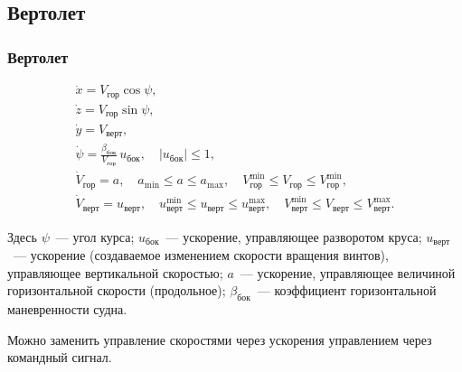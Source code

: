 \documentclass[10pt,t]{beamer}
\begin{document}
\subsection[Вертолет]{Вертолет}
\begin{frame}
\frametitle{Вертолет}
\small

\begin{equation*}
  \begin{array}{l}
    \dot x = V_\text{гор} \cos \psi, \\[0.75ex]
    \dot z = V_\text{гор} \sin \psi, \\[0.75ex]
    \dot y = V_\text{верт}, \\[0.75ex]
    \dot \psi   = \frac{\beta_\text{бок}}{V_\text{гор}} \, u_\text{бок}, \quad |u_\text{бок}| \leqslant 1, \\[0.75ex]
    \dot V_\text{гор} = a, \quad  
      a_{\min} \leqslant a \leqslant a_{\max},
      \quad V^{\min}_\text{гор} \leqslant V_\text{гор} \leqslant V^{\min}_\text{гор}, \\[0.75ex]
    \dot V_\text{верт} = u_\text{верт},
      \quad u^{\min}_\text{верт} \leqslant u_\text{верт} \leqslant u^{\max}_\text{верт}, \quad
      V^{\min}_\text{верт} \leqslant V_\text{верт} \leqslant V^{\max}_\text{верт}.
  \end{array}
\end{equation*}

Здесь $\psi$~--- угол курса; $u_\text{бок}$~--- ускорение, управляющее разворотом круса; $u_\text{верт}$~--- ускорение (создаваемое изменением скорости вращения винтов), управляющее вертикальной скоростью; $a$~--- ускорение, управляющее величиной горизонтальной скорости (продольное); $\beta_\text{бок}$~--- коэффициент горизонтальной маневренности судна.

Можно заменить управление скоростями через ускорения управлением через командный сигнал. 

\end{frame}
\end{document}
